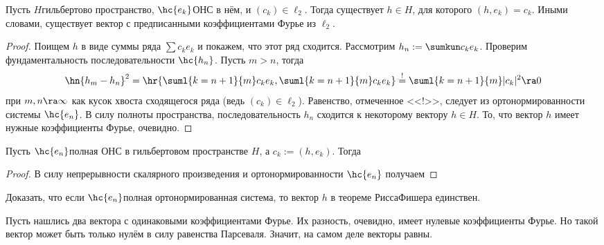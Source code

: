 \documentclass[a4paper]{article}
\begin{document}
\begin{theorem}
Пусть $H$\т гильбертово пространство, $\hc{e_k}$\т ОНС в нём, и $(c_k) \in \ell_2$. Тогда
существует $h \in H$, для которого $(h,e_k) = c_k$. Иными словами, существует вектор с предписанными
коэффициентами Фурье из $\ell_2$.
\end{theorem}
\begin{proof}
Поищем $h$ в виде суммы ряда $\sum c_k e_k$ и покажем, что этот ряд сходится. Рассмотрим
$h_n := \sumkun c_k e_k$. Проверим фундаментальность последовательности $\hc{h_n}$.
Пусть $m > n$, тогда
$$
  \hn{h_m - h_n}^2 = \hr{ \suml{k=n+1}{m}c_k e_k, \suml{k=n+1}{m} c_k e_k  } \stackrel{!}{=}
  \suml{k=n+1}{m}|c_k|^2 \ra 0
$$
при $m, n \ra \infty$ как кусок хвоста сходящегося ряда (ведь $(c_k) \in \ell_2$).
Равенство, отмеченное <<!>>, следует из ортонормированности системы $\hc{e_n}$.
В силу полноты пространства, последовательность $h_n$ сходится к некоторому вектору $h \in H$.
То, что вектор $h$ имеет нужные коэффициенты Фурье, очевидно.
\end{proof}

\begin{stm}
Пусть $\hc{e_n}$\т полная ОНС в гильбертовом пространстве $H$, а $c_k := (h,e_k)$. Тогда
\end{stm}
\begin{proof}
В силу непрерывности скалярного произведения и ортонормированности $\hc{e_n}$ получаем
\end{proof}

\begin{problem}
\label{pr:fourier-coeff-uniqueness}
Доказать, что если $\hc{e_n}$\т полная ортонормированная система, то вектор $h$ в теореме
Рисса\ч Фишера единствен.
\end{problem}
\begin{solution}
Пусть нашлись два вектора с одинаковыми коэффициентами Фурье. Их разность,
очевидно, имеет нулевые коэффициенты Фурье. Но такой вектор может быть
только нулём в силу равенства Парсеваля. Значит, на самом деле векторы равны.
\end{solution}
\end{document}
